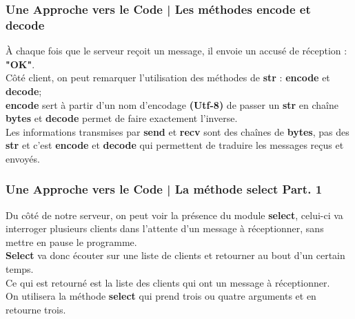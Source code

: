 \documentclass[handout]{beamer}
\begin{document}
	\begin{frame}
	\frametitle{Une Approche vers le Code | Les méthodes encode et decode}
	À chaque fois que le serveur reçoit un message, il envoie un accusé de réception : {\bfseries "OK"}.	\newline \\
	Côté client, on peut remarquer l'utilisation des méthodes de {\bfseries str} :				{\bfseries encode} et {\bfseries decode};\newline \\
	{\bfseries encode} sert à partir d'un nom d'encodage {\bfseries (Utf-8)} de passer un 		{\bfseries str} en chaîne {\bfseries bytes} et {\bfseries decode} permet de faire 					exactement l'inverse.\newline \\
	Les informations transmises par {\bfseries send} et {\bfseries recv} sont des chaînes 		de {\bfseries bytes}, pas des {\bfseries str} et c'est {\bfseries encode} et 				{\bfseries decode} qui permettent de traduire les messages reçus et envoyés.
	\end{frame}

	\begin{frame}
	\frametitle{Une Approche vers le Code | La méthode select Part. 1}
	Du côté de notre serveur, on peut voir la présence du module {\bfseries select}, 			celui-ci va interroger plusieurs clients dans l'attente d'un message à réceptionner, 		sans mettre en pause le programme.\newline \\

	{\bfseries Select} va donc écouter sur une liste de clients et retourner au bout d'un 		certain temps.\newline \\
	Ce qui est retourné est la liste des clients qui ont un message à réceptionner.				\newline \\
	On utilisera la méthode {\bfseries select} qui prend trois ou quatre arguments et en 		retourne trois.
	\end{frame}
	
\end{document}
